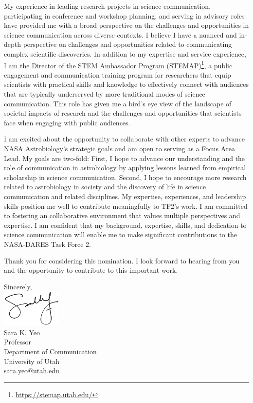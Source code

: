 \documentclass[12pt]{letter}
\begin{document}
My experience in leading research projects in science communication, participating in conference and workshop planning, and serving in advisory roles have provided me with a broad perspective on the challenges and opportunities in science communication across diverse contexts. I believe I have a nuanced and in-depth perspective on challenges and opportunities related to communicating complex scientific discoveries. In addition to my expertise and service experience, I am the Director of the STEM Ambassador Program (STEMAP)\footnote{\href{https://stemap.utah.edu/}{https://stemap.utah.edu/}}, a public engagement and communication training program for researchers that equip scientists with practical skills and knowledge to effectively connect with audiences that are typically underserved by more traditional modes of science communication. This role has given me a bird's eye view of the landscape of societal impacts of research and the challenges and opportunities that scientists face when engaging with public audiences.

I am excited about the opportunity to collaborate with other experts to advance NASA Astrobiology's strategic goals and am open to serving as a Focus Area Lead. My goals are two-fold: First, I hope to advance our understanding and the role of communication in astrobiology by applying lessons learned from empirical scholarship in science communication. Second, I hope to encourage more research related to astrobiology in society and the discovery of life in science communication and related disciplines. My expertise, experiences, and leadership skills position me well to contribute meaningfully to TF2’s work. I am committed to fostering an collaborative environment that values multiple perspectives and expertise. I am confident that my background, expertise, skills, and dedication to science communication will enable me to make significant contributions to the NASA-DARES Task Force 2.

Thank you for considering this nomination. I look forward to hearing from you and the opportunity to contribute to this important work.

\vspace{1em}

Sincerely,\\
\includegraphics[height=5em]{signature.png}\\
Sara K. Yeo\\
Professor\\
Department of Communication\\
University of Utah\\
\href{mailto:sara.yeo@utah.edu}{sara.yeo$@$utah.edu}

\newpage

\printbibliography
\end{document}
